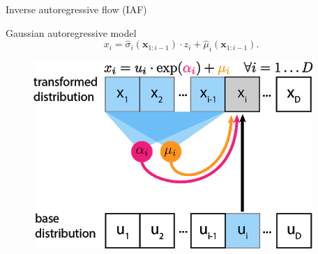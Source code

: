 \documentclass{beamer}
\newcommand{\bx}{\mathbf{x}}
\begin{document}
\begin{frame}{Inverse autoregressive flow (IAF)}

	\begin{minipage}[t]{0.65\columnwidth}
		\begin{block}{Gaussian autoregressive model}
			\[
			x_i = \hat{\sigma}_i (\bx_{1:i-1}) \cdot z_i + \hat{\mu}_i(\bx_{1:i-1}).
			\]
		\end{block}
	\end{minipage}%
	\begin{minipage}[t]{0.35\columnwidth}
		\begin{figure}[h]
			\centering
			\includegraphics[width=.9\linewidth]{figs/maf_iaf_explained_1.png}
		\end{figure}
	\end{minipage} \\
	

\end{frame}
\end{document}
